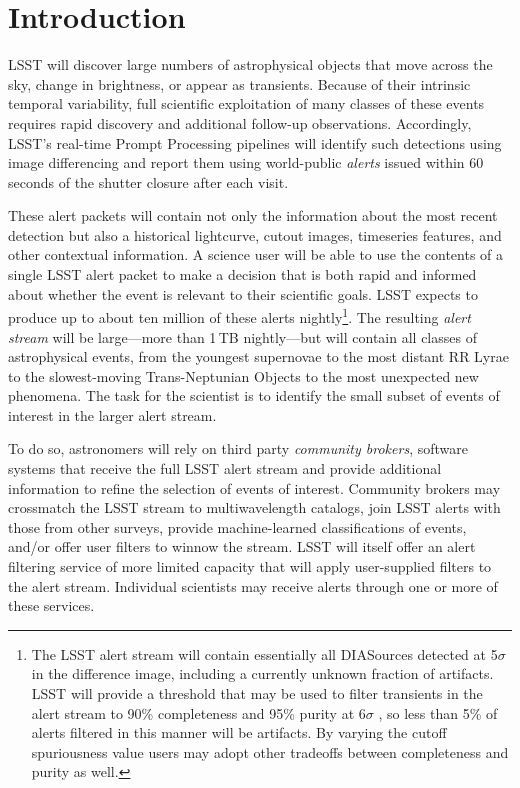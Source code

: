 \section{Introduction}\label{sec:introduction}

LSST will discover large numbers of astrophysical objects that move across the sky, change in brightness, or appear as transients.
Because of their intrinsic temporal variability, full scientific exploitation of many classes of these events requires rapid discovery and additional follow-up observations.
Accordingly, LSST's real-time Prompt Processing pipelines will identify such detections using image differencing and report them using world-public \textit{alerts} issued within 60 seconds of the shutter closure after each visit.

These alert packets will contain not only the information about the most recent detection but also a historical lightcurve, cutout images, timeseries features, and other contextual information.
A science user will be able to use the contents of a single LSST alert packet to make a decision that is both rapid and informed about whether the event is relevant to their scientific goals.
LSST expects to produce up to about ten million of these alerts nightly\footnote{The LSST alert stream will contain essentially all DIASources detected at 5$\sigma$ in the difference image, including a currently unknown fraction of artifacts.
LSST will provide a threshold that may be used to filter transients in the alert stream to 90\% completeness and 95\% purity at 6$\sigma$ , so less than 5\% of alerts filtered in this manner will be artifacts.
By varying the cutoff spuriousness value users may adopt other tradeoffs between completeness and purity as well.}.
The resulting \textit{alert stream} will be large---more than 1\,TB nightly---but will contain all classes of astrophysical events, from the youngest supernovae to the most distant RR Lyrae to the slowest-moving Trans-Neptunian Objects to the most unexpected new phenomena.
The task for the scientist is to identify the small subset of events of interest in the larger alert stream.

To do so, astronomers will rely on third party \textit{community brokers}, software systems that receive the full LSST alert stream and provide additional information to refine the selection of events of interest.
Community brokers may crossmatch the LSST stream to multiwavelength catalogs, join LSST alerts with those from other surveys, provide machine-learned classifications of events, and/or offer user filters to winnow the stream.
LSST will itself offer an alert filtering service of more limited capacity that will apply user-supplied filters to the alert stream.
Individual scientists may receive alerts through one or more of these services.

